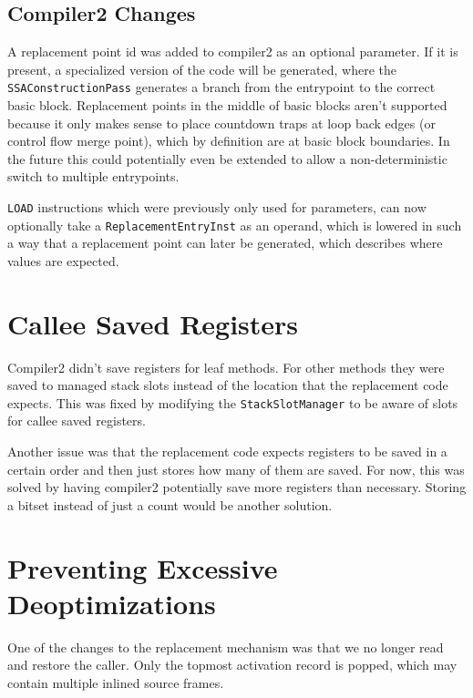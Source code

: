 \documentclass[draft,final]{vutinfth} %
\begin{document}
    \subsection{Compiler2 Changes}

    A replacement point id was added to compiler2 as an optional parameter.
    If it is present, a specialized version of the code will be generated,
    where the \lstinline{SSAConstructionPass} generates a branch from the entrypoint to the correct basic block.
    Replacement points in the middle of basic blocks aren't supported
    because it only makes sense to place countdown traps at loop back edges (or control flow merge point),
    which by definition are at basic block boundaries.
    In the future this could potentially even be extended to allow
    a non-deterministic switch to multiple entrypoints.

    \lstinline{LOAD} instructions
    which were previously only used for parameters,
    can now optionally take a \lstinline{ReplacementEntryInst}
    as an operand,
    which is lowered in such a way
    that a replacement point can later be generated,
    which describes where values are expected.


    \section{Callee Saved Registers}

    Compiler2 didn't save registers for leaf methods.
    For other methods they were saved to managed stack slots
    instead of the location that the replacement code expects.
    This was fixed by modifying the \lstinline{StackSlotManager}
    to be aware of slots for callee saved registers.

    Another issue was that the replacement code expects
    registers to be saved in a certain order and then just stores how many
    of them are saved.
    For now, this was solved by having compiler2 potentially save
    more registers than necessary.
    Storing a bitset instead of just a count would be another solution.


    \section{Preventing Excessive Deoptimizations}

    One of the changes to the replacement mechanism
    was that we no longer read and restore the caller.
    Only the topmost activation record is popped,
    which may contain multiple inlined source frames.
\end{document}
